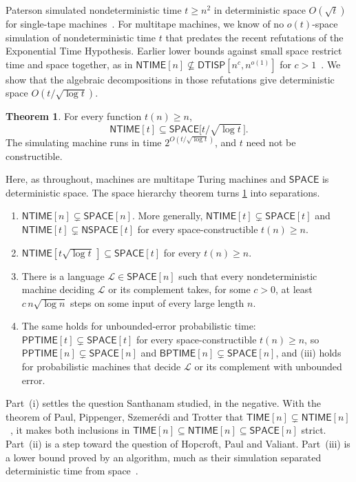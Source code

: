 \documentclass[11pt]{article}
\theoremstyle{definition}
\newtheorem{theorem}{Theorem}[section]
\theoremstyle{definition}
\theoremstyle{remark}
\newcommand{\NTIME}{\mathsf{NTIME}}
\newcommand{\TIME}{\mathsf{TIME}}
\newcommand{\SPACE}{\mathsf{SPACE}}
\newcommand{\NSPACE}{\mathsf{NSPACE}}
\newcommand{\BPTIME}{\mathsf{BPTIME}}
\newcommand{\PPTIME}{\mathsf{PPTIME}}
\begin{document}
Paterson simulated nondeterministic time $t\ge n^2$ in deterministic space $O(\sqrt t)$ for single-tape machines~\cite{Pat72}. For multitape machines, we know of no $o(t)$-space simulation of nondeterministic time $t$ that predates the recent refutations of the Exponential Time Hypothesis. Earlier lower bounds against small space restrict time and space together, as in $\NTIME[n]\not\subseteq\mathsf{DTISP}[n^c,n^{o(1)}]$ for $c>1$~\cite{vM06}. We show that the algebraic decompositions in those refutations give deterministic space $O(t/\sqrt{\log t})$.

\begin{theorem}\label{thm:main}
For every function $t(n)\ge n$,
\[
\NTIME[t]\subseteq\SPACE\bigl[t/\sqrt{\log t}\,\bigr].
\]
The simulating machine runs in time $2^{O(t/\sqrt{\log t})}$, and $t$ need not be constructible.
\end{theorem}

Here, as throughout, machines are multitape Turing machines and $\SPACE$ is deterministic space. The space hierarchy theorem turns \cref{thm:main} into separations.

\begin{corollary}\label{cor:sep}\leavevmode
\begin{enumerate}[label=(\roman*)]
\item $\NTIME[n]\subsetneq\SPACE[n]$. More generally, $\NTIME[t]\subsetneq\SPACE[t]$ and $\NTIME[t]\subsetneq\NSPACE[t]$ for every space-constructible $t(n)\ge n$.
\item $\NTIME[t\sqrt{\log t}\,]\subseteq\SPACE[t]$ for every $t(n)\ge n$.
\item There is a language $\mathcal L\in\SPACE[n]$ such that every nondeterministic machine deciding $\mathcal L$ or its complement takes, for some $c>0$, at least $c\,n\sqrt{\log n}$ steps on some input of every large length $n$.
\item The same holds for unbounded-error probabilistic time: $\PPTIME[t]\subsetneq\SPACE[t]$ for every space-constructible $t(n)\ge n$, so $\PPTIME[n]\subsetneq\SPACE[n]$ and $\BPTIME[n]\subsetneq\SPACE[n]$, and (iii) holds for probabilistic machines that decide $\mathcal L$ or its complement with unbounded error.
\end{enumerate}
\end{corollary}

Part~(i) settles the question Santhanam studied, in the negative. With the theorem of Paul, Pippenger, Szemer\'edi and Trotter that $\TIME[n]\subsetneq\NTIME[n]$~\cite{PPST83}, it makes both inclusions in $\TIME[n]\subseteq\NTIME[n]\subseteq\SPACE[n]$ strict. Part~(ii) is a step toward the question of Hopcroft, Paul and Valiant. Part~(iii) is a lower bound proved by an algorithm, much as their simulation separated deterministic time from space~\cite{HPV77}.
\end{document}
